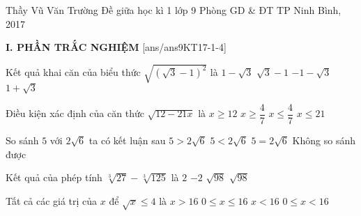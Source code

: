 \begin{name}
{Thầy  Vũ Văn Trường}
{Đề giữa học kì 1 lớp 9 Phòng GD \& ĐT TP Ninh Bình, 2017}
\end{name}
\noindent\textbf{I. PHẦN TRẮC NGHIỆM}
\setcounter{ex}{0}
[ans/ans9KT17-1-4]
\begin{ex}%
Kết quả khai căn của biểu thức $\sqrt{\left(\sqrt{3}-1\right)^2}$ là
\choice
{$1-\sqrt{3}$}
{\True $\sqrt{3}-1$}
{$-1-\sqrt{3}$}
{$1+\sqrt{3}$}
\end{ex}

\begin{ex}%
Điều kiện xác định của căn thức $\sqrt{12-21x}$ là
\choice
{$x\geq 12$}
{$x\geq \dfrac{4}{7}$}
{\True $x\leq \dfrac{4}{7}$}
{$x\leq 21$}
\end{ex}

\begin{ex}%
So sánh $5$ với $2\sqrt{6}$ ta có kết luận sau
\choice
{\True $5>2\sqrt{6}$}
{$5<2\sqrt{6}$}
{$5=2\sqrt{6}$}
{Không so sánh được}
\end{ex}

\begin{ex}%
Kết quả của phép tính $\sqrt[3]{27}-\sqrt[3]{125}$ là
\choice
{$2$}
{\True $-2$}
{$\sqrt{98}$}
{$\sqrt{98}$}
\end{ex}

\begin{ex}%
Tất cả các giá trị của $x$ để $\sqrt{x}\leq 4$ là
\choice
{$x>16$}
{\True $0\leq x\leq 16$}
{$x<16$}
{$0\leq x< 16$}
\end{ex}

